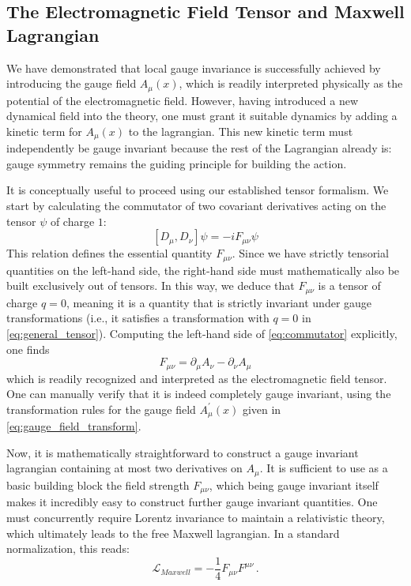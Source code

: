 \subsection{The Electromagnetic Field Tensor and Maxwell Lagrangian}

We have demonstrated that local gauge invariance is successfully achieved by introducing the gauge field \(A_\mu(x)\), which is readily interpreted physically as the potential of the electromagnetic field. However, having introduced a new dynamical field into the theory, one must grant it suitable dynamics by adding a kinetic term for \(A_\mu(x)\) to the lagrangian. This new kinetic term must independently be gauge invariant because the rest of the Lagrangian already is: gauge symmetry remains the guiding principle for building the action.

It is conceptually useful to proceed using our established tensor formalism. We start by calculating the commutator of two covariant derivatives acting on the tensor \(\psi\) of charge \(1\):
\begin{equation} \label{eq:commutator}
    [D_\mu, D_\nu]\psi = -iF_{\mu\nu}\psi
\end{equation}
This relation defines the essential quantity \(F_{\mu\nu}\). Since we have strictly tensorial quantities on the left-hand side, the right-hand side must mathematically also be built exclusively out of tensors. In this way, we deduce that \(F_{\mu\nu}\) is a tensor of charge \(q = 0\), meaning it is a quantity that is strictly invariant under gauge transformations (i.e., it satisfies a transformation with \(q = 0\) in \eqref{eq:general_tensor}). Computing the left-hand side of \eqref{eq:commutator} explicitly, one finds
\begin{equation} \label{eq:field_strength}
    F_{\mu\nu} = \partial_\mu A_\nu - \partial_\nu A_\mu
\end{equation}
which is readily recognized and interpreted as the electromagnetic field tensor. One can manually verify that it is indeed completely gauge invariant, using the transformation rules for the gauge field \(A^{\prime}_\mu(x)\) given in \eqref{eq:gauge_field_transform}.

Now, it is mathematically straightforward to construct a gauge invariant lagrangian containing at most two derivatives on \(A_\mu\). It is sufficient to use as a basic building block the field strength \(F_{\mu\nu}\), which being gauge invariant itself makes it incredibly easy to construct further gauge invariant quantities. One must concurrently require Lorentz invariance to maintain a relativistic theory, which ultimately leads to the free Maxwell lagrangian. In a standard normalization, this reads:
\begin{equation} \label{eq:maxwell_lagrangian}
    \mathcal{L}_{Maxwell} = -\frac{1}{4}F_{\mu\nu}F^{\mu\nu} \, .
\end{equation}

